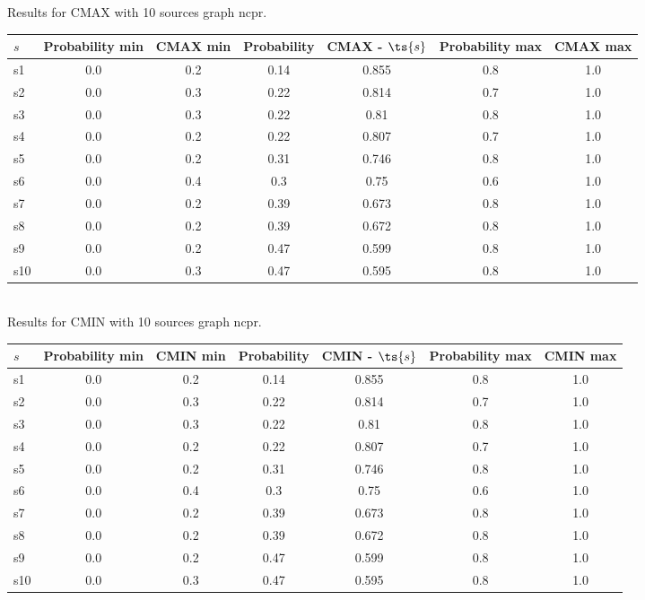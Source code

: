 \documentclass{article}
\begin{document}
\noindent Results for CMAX with 10 sources graph ncpr.

\noindent\begin{tabular}{|l|c|c|c|c|c|c|}
\hline
$s$& Probability min & CMAX min & Probability & CMAX - $\ts{s}$ & Probability max & CMAX max\\
\hline
s1 &0.0 & 0.2 & 0.14 & 0.855 & 0.8 & 1.0\\
\hline
s2 &0.0 & 0.3 & 0.22 & 0.814 & 0.7 & 1.0\\
\hline
s3 &0.0 & 0.3 & 0.22 & 0.81 & 0.8 & 1.0\\
\hline
s4 &0.0 & 0.2 & 0.22 & 0.807 & 0.7 & 1.0\\
\hline
s5 &0.0 & 0.2 & 0.31 & 0.746 & 0.8 & 1.0\\
\hline
s6 &0.0 & 0.4 & 0.3 & 0.75 & 0.6 & 1.0\\
\hline
s7 &0.0 & 0.2 & 0.39 & 0.673 & 0.8 & 1.0\\
\hline
s8 &0.0 & 0.2 & 0.39 & 0.672 & 0.8 & 1.0\\
\hline
s9 &0.0 & 0.2 & 0.47 & 0.599 & 0.8 & 1.0\\
\hline
s10 &0.0 & 0.3 & 0.47 & 0.595 & 0.8 & 1.0\\
\hline
\end{tabular}\\

\noindent Results for CMIN with 10 sources graph ncpr.

\noindent\begin{tabular}{|l|c|c|c|c|c|c|}
\hline
$s$& Probability min & CMIN min & Probability & CMIN - $\ts{s}$ & Probability max & CMIN max\\
\hline
s1 &0.0 & 0.2 & 0.14 & 0.855 & 0.8 & 1.0\\
\hline
s2 &0.0 & 0.3 & 0.22 & 0.814 & 0.7 & 1.0\\
\hline
s3 &0.0 & 0.3 & 0.22 & 0.81 & 0.8 & 1.0\\
\hline
s4 &0.0 & 0.2 & 0.22 & 0.807 & 0.7 & 1.0\\
\hline
s5 &0.0 & 0.2 & 0.31 & 0.746 & 0.8 & 1.0\\
\hline
s6 &0.0 & 0.4 & 0.3 & 0.75 & 0.6 & 1.0\\
\hline
s7 &0.0 & 0.2 & 0.39 & 0.673 & 0.8 & 1.0\\
\hline
s8 &0.0 & 0.2 & 0.39 & 0.672 & 0.8 & 1.0\\
\hline
s9 &0.0 & 0.2 & 0.47 & 0.599 & 0.8 & 1.0\\
\hline
s10 &0.0 & 0.3 & 0.47 & 0.595 & 0.8 & 1.0\\
\hline
\end{tabular}\\
\end{document}
